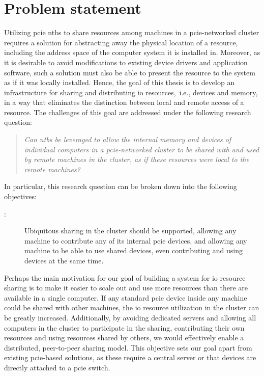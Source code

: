 \section{Problem statement}\label{sec:objectives}
Utilizing \gls{pcie} \glspl{ntb} to share resources among machines in a \gls{pcie}-networked cluster requires a 
solution for abstracting away the physical location of a resource, including the address space of the computer system it is installed in. Moreover, as it is desirable to avoid modifications to existing device drivers and application software, such a solution must also be able to present the resource to the system as if it was locally installed.
%
Hence, the goal of this thesis is to develop an infrastructure for sharing and distributing \gls{io} resources,~i.e., devices and memory, in a way that eliminates the distinction between local and remote access of a resource. The challenges of this goal are addressed under the following research question: 
\begin{quote}\itshape
    Can \glspl{ntb} be leveraged to allow the internal memory and devices of individual computers in a \gls{pcie}-networked cluster to be shared with and used by remote machines in the cluster, as if these resources were local to the remote machines?
\end{quote}
%
In particular, this research question can be broken down into the following objectives:
%
\begin{description}
    \item[:] Ubiquitous sharing in the cluster should be supported, allowing any machine to contribute any of its internal \gls{pcie} devices, and allowing any machine to be able to use shared devices, even contributing and using devices at the same time.
\end{description}
Perhaps the main motivation for our goal of building a system for \gls{io} resource sharing is to make it easier to scale out and use more resources than there are available in a single computer. 
If any standard \gls{pcie} device inside any machine could be shared with other machines, the \gls{io} resource utilization in the cluster can be greatly increased.
Additionally, by avoiding dedicated servers and allowing all computers in the cluster to participate in the sharing, contributing their own resources and using resources shared by others, we would effectively enable a distributed, peer-to-peer sharing model. This objective sets our goal apart from existing \gls{pcie}-based solutions, as these require a central server or that devices are directly attached to a \gls{pcie} switch.


